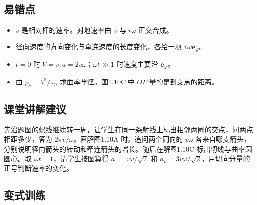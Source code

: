 \documentclass[UTF8,fontset=fandol,a4paper,11pt]{ctexart}
\newcommand{\vect}[1]{\bm{#1}}
\begin{document}


\subsection*{易错点}

\begin{itemize}
\item $v$ 是相对杆的速率。对地速率由 $v$ 与 $r\omega$ 正交合成。
\item 径向速度的方向变化与牵连速度的长度变化，各给一项 $v\omega\vect e_\varphi$。
\item $t=0$ 时 $V=v,a=2v\omega$；$\omega t\gg1$ 时速度主要沿 $\vect e_\varphi$。
\item 由 $\rho_c=V^2/a_n$ 求曲率半径。图1.10C 中 $OP$ 量的是到支点的距离。
\end{itemize}



\subsection*{课堂讲解建议}

先沿题图的螺线继续转一周，让学生在同一条射线上标出相邻两圈的交点，问两点相距多少，答为 $2\pi v/\omega$。画解图1.10A 时，追问两个同向的 $v\omega$ 各来自哪支箭头，分别说明径向箭头的转动和牵连箭头的增长。随后在解图1.10C 标出切线与曲率圆圆心。取 $\omega t=1$，请学生按图算得 $a_\tau=v\omega/\sqrt2$ 和 $a_n=3v\omega/\sqrt2$，用切向分量的正号判断速率的变化。



\subsection*{变式训练}
\end{document}
